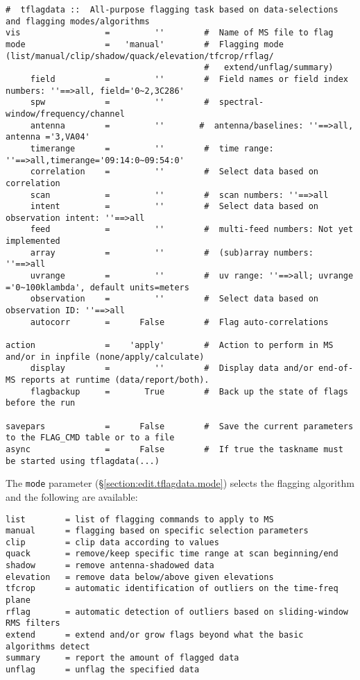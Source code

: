 \small
\begin{verbatim}
#  tflagdata ::  All-purpose flagging task based on data-selections and flagging modes/algorithms
vis                 =         ''        #  Name of MS file to flag
mode                =   'manual'        #  Flagging mode (list/manual/clip/shadow/quack/elevation/tfcrop/rflag/
                                        #   extend/unflag/summary)
     field          =         ''        #  Field names or field index numbers: ''==>all, field='0~2,3C286'
     spw            =         ''        #  spectral-window/frequency/channel
     antenna        =         ''       #  antenna/baselines: ''==>all, antenna ='3,VA04'
     timerange      =         ''        #  time range: ''==>all,timerange='09:14:0~09:54:0'
     correlation    =         ''        #  Select data based on correlation
     scan           =         ''        #  scan numbers: ''==>all
     intent         =         ''        #  Select data based on observation intent: ''==>all
     feed           =         ''        #  multi-feed numbers: Not yet implemented
     array          =         ''        #  (sub)array numbers: ''==>all
     uvrange        =         ''        #  uv range: ''==>all; uvrange ='0~100klambda', default units=meters
     observation    =         ''        #  Select data based on observation ID: ''==>all
     autocorr       =      False        #  Flag auto-correlations

action              =    'apply'        #  Action to perform in MS and/or in inpfile (none/apply/calculate)
     display        =         ''        #  Display data and/or end-of-MS reports at runtime (data/report/both).
     flagbackup     =       True        #  Back up the state of flags before the run

savepars            =      False        #  Save the current parameters to the FLAG_CMD table or to a file
async               =      False        #  If true the taskname must be started using tflagdata(...)

\end{verbatim}
\normalsize


The {\tt mode} parameter (\S \ref{section:edit.tflagdata.mode}) selects the flagging algorithm and the following are available:

\small
\begin{verbatim}
list        = list of flagging commands to apply to MS
manual      = flagging based on specific selection parameters
clip        = clip data according to values
quack       = remove/keep specific time range at scan beginning/end
shadow      = remove antenna-shadowed data
elevation   = remove data below/above given elevations
tfcrop      = automatic identification of outliers on the time-freq plane
rflag       = automatic detection of outliers based on sliding-window RMS filters
extend      = extend and/or grow flags beyond what the basic algorithms detect
summary     = report the amount of flagged data
unflag      = unflag the specified data
\end{verbatim}
\normalsize

